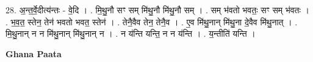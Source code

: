 \documentclass[17pt]{extarticle}
\begin{document}
28. अ॒न्त॒र्वे॒दीत्य॑न्तः - वे॒दि । . मि॒थु॒नौ सꣳ सम् मि॑थु॒नौ मि॑थु॒नौ सम् । . सम् भ॑वतो भवतः॒ सꣳ सम् भ॑वतः । . भ॒व॒त॒ स्तेन॒ तेन॑ भवतो भवत॒ स्तेन॑ । . तेनै॒वैव तेन॒ तेनै॒व । . ए॒व मि॑थु॒नान् मि॑थु॒ना दे॒वैव मि॑थु॒नात् । . मि॒थु॒नान् न न मि॑थु॒नान् मि॑थु॒नान् न । . न य॑न्ति यन्ति॒ न न य॑न्ति । . य॒न्तीति॑ यन्ति । \newline

\textbf{Ghana Paata } \newline
\end{document}
